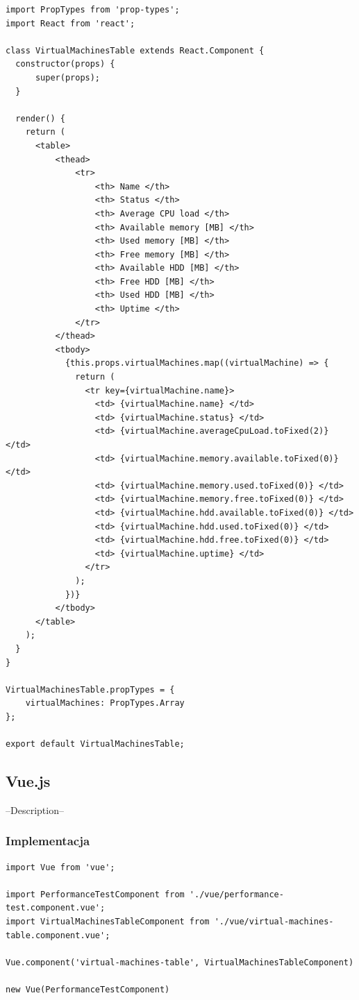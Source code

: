 \documentclass[polish, twoside, 12pt]{mwart}
\begin{document}
\begin{lstlisting}[caption=Komponent tabeli]
import PropTypes from 'prop-types'; 
import React from 'react';

class VirtualMachinesTable extends React.Component {
  constructor(props) {
      super(props);
  }

  render() {
    return (
      <table>
          <thead>
              <tr>
                  <th> Name </th>
                  <th> Status </th>
                  <th> Average CPU load </th>
                  <th> Available memory [MB] </th>
                  <th> Used memory [MB] </th>
                  <th> Free memory [MB] </th>
                  <th> Available HDD [MB] </th>
                  <th> Free HDD [MB] </th>
                  <th> Used HDD [MB] </th>
                  <th> Uptime </th>
              </tr>
          </thead>
          <tbody>
            {this.props.virtualMachines.map((virtualMachine) => {
              return (
                <tr key={virtualMachine.name}>
                  <td> {virtualMachine.name} </td>
                  <td> {virtualMachine.status} </td>
                  <td> {virtualMachine.averageCpuLoad.toFixed(2)} </td>
                  <td> {virtualMachine.memory.available.toFixed(0)} </td>
                  <td> {virtualMachine.memory.used.toFixed(0)} </td>
                  <td> {virtualMachine.memory.free.toFixed(0)} </td>
                  <td> {virtualMachine.hdd.available.toFixed(0)} </td>
                  <td> {virtualMachine.hdd.used.toFixed(0)} </td>
                  <td> {virtualMachine.hdd.free.toFixed(0)} </td>
                  <td> {virtualMachine.uptime} </td>
                </tr>
              );
            })}
          </tbody>
      </table>
    );
  }
}

VirtualMachinesTable.propTypes = {
    virtualMachines: PropTypes.Array
};

export default VirtualMachinesTable;
\end{lstlisting}

\subsection{Vue.js}

--Description--

\subsubsection{Implementacja}

\begin{lstlisting}[caption=Inicjalizacja głównego komponentu]
import Vue from 'vue';

import PerformanceTestComponent from './vue/performance-test.component.vue';
import VirtualMachinesTableComponent from './vue/virtual-machines-table.component.vue';

Vue.component('virtual-machines-table', VirtualMachinesTableComponent)

new Vue(PerformanceTestComponent)
\end{lstlisting}
\end{document}
